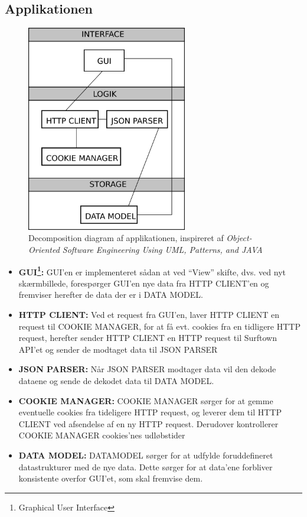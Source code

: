 \documentclass[12pt]{article}
\begin{document}
\subsection*{Applikationen}
\begin{figure}[h]
	\centering
	\includegraphics[width=7cm]{system_components.png}
	\caption{Decomposition diagram af applikationen, inspireret af \emph{Object-Oriented Software Engineering Using UML, Patterns, and JAVA}\cite{OOSE}}
	\label{system_components}
\end{figure}
\begin{itemize}
	\item{\textbf{GUI\footnote{Graphical User Interface}: } GUI'en er implementeret sådan at ved ``View'' skifte, dvs. ved nyt skærmbillede, forespørger GUI'en nye data fra  HTTP CLIENT'en og fremviser herefter de data der er i DATA MODEL.}	
	\item{\textbf{HTTP CLIENT: } Ved et request fra GUI'en, laver HTTP CLIENT en request til COOKIE MANAGER, for at få evt. cookies fra en tidligere HTTP request, herefter sender HTTP CLIENT en HTTP request til Surftown API'et og sender de modtaget data til JSON PARSER}	
	\item{\textbf{JSON PARSER: }Når JSON PARSER modtager data vil den dekode dataene og sende de dekodet data til DATA MODEL.}
	\item{\textbf{COOKIE MANAGER: }COOKIE MANAGER sørger for at gemme eventuelle cookies fra tideligere HTTP request, og leverer dem til HTTP CLIENT ved afsendelse af en ny HTTP request. Derudover kontrollerer COOKIE MANAGER cookies'nes udløbstider}
	\item{\textbf{DATA MODEL: }DATAMODEL sørger for at udfylde foruddefineret datastrukturer med de nye data. Dette sørger for at data'ene forbliver konsistente overfor GUI'et, som skal fremvise dem.}
\end{itemize}
\end{document}
